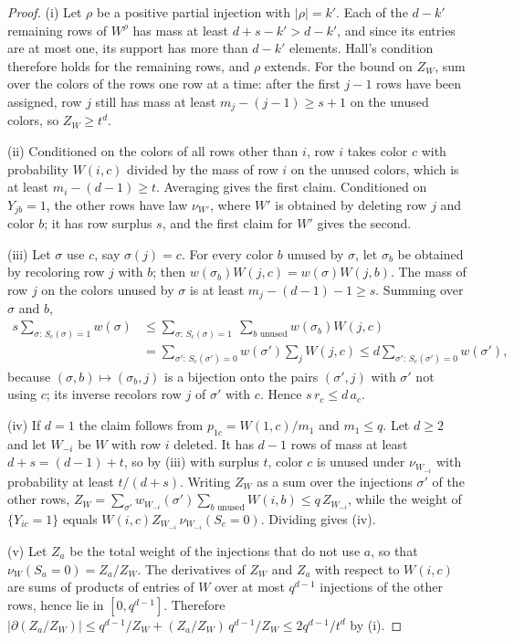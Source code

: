 \documentclass{amsart}
\numberwithin{equation}{section}
\theoremstyle{plain}
\theoremstyle{definition}
\theoremstyle{remark}
\begin{document}
\begin{proof}
(i) Let $\rho$ be a positive partial injection with $|\rho|=k'$. Each of the $d-k'$ remaining rows of $W^\rho$ has mass at least $d+s-k'>d-k'$, and since its entries are at most one, its support has more than $d-k'$ elements. Hall's condition therefore holds for the remaining rows, and $\rho$ extends. For the bound on $Z_W$, sum over the colors of the rows one row at a time: after the first $j-1$ rows have been assigned, row $j$ still has mass at least $m_j-(j-1)\ge s+1$ on the unused colors, so $Z_W\ge t^d$.

(ii) Conditioned on the colors of all rows other than $i$, row $i$ takes color $c$ with probability $W(i,c)$ divided by the mass of row $i$ on the unused colors, which is at least $m_i-(d-1)\ge t$. Averaging gives the first claim. Conditioned on $Y_{jb}=1$, the other rows have law $\nu_{W'}$, where $W'$ is obtained by deleting row $j$ and color $b$; it has row surplus $s$, and the first claim for $W'$ gives the second.

(iii) Let $\sigma$ use $c$, say $\sigma(j)=c$. For every color $b$ unused by $\sigma$, let $\sigma_b$ be obtained by recoloring row $j$ with $b$; then $w(\sigma_b)W(j,c)=w(\sigma)W(j,b)$. The mass of row $j$ on the colors unused by $\sigma$ is at least $m_j-(d-1)-1\ge s$. Summing over $\sigma$ and $b$,
\begin{align*}
s\sum_{\sigma:\,S_c(\sigma)=1}w(\sigma)&\le\sum_{\sigma:\,S_c(\sigma)=1}\ \sum_{b\text{ unused}}w(\sigma_b)W(j,c)\\
&=\sum_{\sigma':\,S_c(\sigma')=0}w(\sigma')\sum_{j}W(j,c)\le d\sum_{\sigma':\,S_c(\sigma')=0}w(\sigma'),
\end{align*}
because $(\sigma,b)\mapsto(\sigma_b,j)$ is a bijection onto the pairs $(\sigma',j)$ with $\sigma'$ not using $c$; its inverse recolors row $j$ of $\sigma'$ with $c$. Hence $s\,r_c\le d\,a_c$.

(iv) If $d=1$ the claim follows from $p_{1c}=W(1,c)/m_1$ and $m_1\le q$. Let $d\ge2$ and let $W_{-i}$ be $W$ with row $i$ deleted. It has $d-1$ rows of mass at least $d+s=(d-1)+t$, so by (iii) with surplus $t$, color $c$ is unused under $\nu_{W_{-i}}$ with probability at least $t/(d+s)$. Writing $Z_W$ as a sum over the injections $\sigma'$ of the other rows, $Z_W=\sum_{\sigma'}w_{W_{-i}}(\sigma')\sum_{b\text{ unused}}W(i,b)\le q\,Z_{W_{-i}}$, while the weight of $\{Y_{ic}=1\}$ equals $W(i,c)Z_{W_{-i}}\,\nu_{W_{-i}}(S_c=0)$. Dividing gives (iv).

(v) Let $Z_a$ be the total weight of the injections that do not use $a$, so that $\nu_W(S_a=0)=Z_a/Z_W$. The derivatives of $Z_W$ and $Z_a$ with respect to $W(i,c)$ are sums of products of entries of $W$ over at most $q^{d-1}$ injections of the other rows, hence lie in $[0,q^{d-1}]$. Therefore $|\partial(Z_a/Z_W)|\le q^{d-1}/Z_W+(Z_a/Z_W)\,q^{d-1}/Z_W\le2q^{d-1}/t^d$ by (i).
\end{proof}
\end{document}
